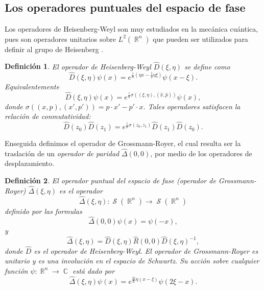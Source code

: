 \documentclass[a4paper]{report}
\DeclareMathOperator{\R}{\mathbb{R}}
\DeclareMathOperator{\C}{\mathbb{C}}
\DeclareMathOperator{\Sz}{\mathcal S}
\newtheorem{definition}{Definición}
\begin{document}
  \subsection{Los operadores puntuales del espacio de fase}

  Los operadores de Heisenberg-Weyl son muy estudiados en la
  mecánica cuántica, pues son operadores unitarios sobre
  $L^2(\R^{n})$ que pueden ser utilizados para definir al
  grupo de Heisenberg \cite{degosson2011}.
  \begin{definition}
    El operador de Heisenberg-Weyl $\hat{D}(\xi,\eta)$ se
    define como
    \begin{equation}
      \hat{D}(\xi,\eta)\psi(x)
      = e^{\frac{i}{\hbar} (\eta x - \frac{1}{2} \eta
      \xi)}\psi(x - \xi).
    \end{equation} 
    Equivalentemente
    \begin{equation}
      \hat{D}(\xi,\eta)\psi(x)
      = e^{\frac{i}{\hbar} \sigma((\xi,\eta),
      (\hat{x},\hat{p}))}\psi(x),
    \end{equation} 
    donde $\sigma((x,p),(x',p')) = p \cdot x' - p' \cdot x$.
    Tales operadores satisfacen la relación de
    conmutatividad:
    \begin{equation}
      \hat{D}(z_0)\hat{D}(z_1)
      = e^{\frac{i}{\hbar} \sigma(z_0,z_1)}
      \hat{D}(z_1)\hat{D}(z_0).
    \end{equation} 
  \end{definition}
  Enseguida definimos el operador de Grossmann-Royer, el
  cual resulta ser la traslación de un \textit{operador de
  paridad} $\hat \Delta(0,0)$, por medio de los operadores
  de desplazamiento.
  \begin{definition}
    El operador puntual del espacio de fase (operador de
    Grossmann-Royer) $\hat{\Delta}(\xi,\eta)$ es el operador
    \begin{equation}
      \hat{\Delta}(\xi,\eta) : \Sz(\R^{n}) \to \Sz(\R^{n})
    \end{equation} 
    definido por las formulas 
    \begin{equation}
      \hat{\Delta}(0,0)\psi(x)
      = \psi(-x),
    \end{equation}
    y
    \begin{equation}
      \hat{\Delta}(\xi,\eta)
      = \hat{D}(\xi,\eta) \hat{R}(0,0)
      \hat{D}(\xi,\eta)^{-1},
    \end{equation} 
    donde $\hat D$ es el operador de Heisenberg-Weyl. El
    operador de Grossmann-Royer es unitario y es una
    involución en el espacio de Schwartz. Su acción sobre
    cualquier función $\psi : \R^{n} \to \C$ está dado por
    \begin{equation}
      \hat{\Delta}(\xi,\eta)\psi(x)
      = e^{\frac{2i}{\hbar} \eta (x - \xi)}\psi(2\xi - x).
    \end{equation} 
  \end{definition}
\end{document}

